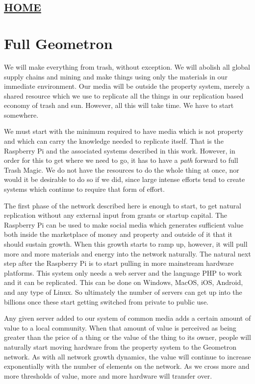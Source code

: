 \hypertarget{home}{%
\subsection{\texorpdfstring{\href{scrolls/home}{HOME}}{HOME}}\label{home}}

\hypertarget{full-geometron}{%
\section{Full Geometron}\label{full-geometron}}

We will make everything from trash, without exception. We will abolish
all global supply chains and mining and make things using only the
materials in our immediate environment. Our media will be outside the
property system, merely a shared resource which we use to replicate all
the things in our replication based economy of trash and sun. However,
all this will take time. We have to start somewhere.

We must start with the minimum required to have media which is not
property and which can carry the knowledge needed to replicate itself.
That is the Raspberry Pi and the associated systems described in this
work. However, in order for this to get where we need to go, it has to
have a \emph{path} forward to full Trash Magic. We do not have the
resources to do the whole thing at once, nor would it be desirable to do
so if we did, since large intense efforts tend to create systems which
continue to require that form of effort.

The first phase of the network described here is enough to start, to get
natural replication without any external input from grants or startup
capital. The Raspberry Pi can be used to make social media which
generates sufficient value both inside the marketplace of money and
property and outside of it that it should sustain growth. When this
growth starts to ramp up, however, it will pull more and more materials
and energy into the network naturally. The natural next step after the
Raspberry Pi is to start pulling in more mainstream hardware platforms.
This system only needs a web server and the language PHP to work and it
can be replicated. This can be done on Windows, MacOS, iOS, Android, and
any type of Linux. So ultimately the number of servers can get up into
the billions once these start getting switched from private to public
use.

Any given server added to our system of common media adds a certain
amount of value to a local community. When that amount of value is
perceived as being greater than the price of a thing or the value of the
thing to its owner, people will naturally start moving hardware from the
property system to the Geometron network. As with all network growth
dynamics, the value will continue to increase exponentially with the
number of elements on the network. As we cross more and more thresholds
of value, more and more hardware will transfer over.

